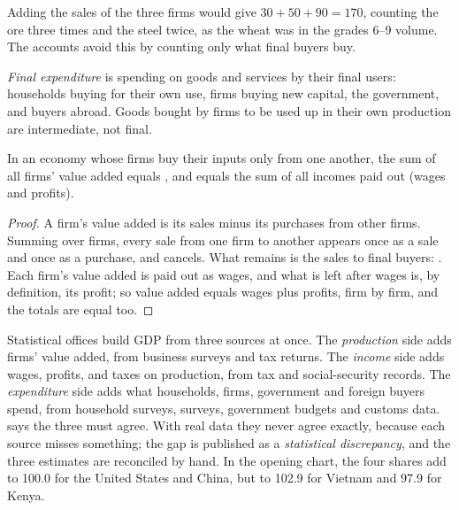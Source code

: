 Adding the sales of the three firms would give $30 + 50 + 90 = 170$, counting the ore three times and the steel twice, as the wheat was in the grades 6--9 volume. The accounts avoid this by
counting only what final buyers buy.

\begin{definition}\label{def:g10:national-accounts:final-expenditure}
\emph{Final expenditure} is spending on goods and services by their final users: households buying for their own use, firms
buying new capital, the government, and buyers abroad. Goods bought by firms to be used up in their own production are intermediate, not final.
\end{definition}

\begin{proposition}\label{prop:g10:national-accounts:three}
In an economy whose firms buy their inputs only from one another, the sum of all firms' value added equals , and equals the sum of all
incomes paid out (wages and profits).
\end{proposition}
\begin{proof}
A firm's value added is its sales minus its purchases from other firms. Summing over firms, every sale from one firm to another appears once as a sale
and once as a purchase, and cancels. What remains is the sales to final buyers: . Each firm's value added is paid out as wages, and what is
left after wages is, by definition, its profit; so value added equals wages plus profits, firm by firm, and the totals are equal too.
\end{proof}

\begin{measure}
Statistical offices build GDP from three sources at once. The \emph{production} side adds firms' value added, from business surveys and tax returns. The
\emph{income} side adds wages, profits, and taxes on production, from tax and social-security records. The \emph{expenditure} side adds what households,
firms, government and foreign buyers spend, from household surveys,  surveys, government budgets and customs data. 
says the three must agree. With real data they never agree exactly, because each source misses something; the gap is published as a \emph{statistical
discrepancy}, and the three estimates are reconciled by hand. In the opening chart, the four shares add to 100.0 for the United States and China, but to
102.9 for Vietnam and 97.9 for Kenya.
\end{measure}

